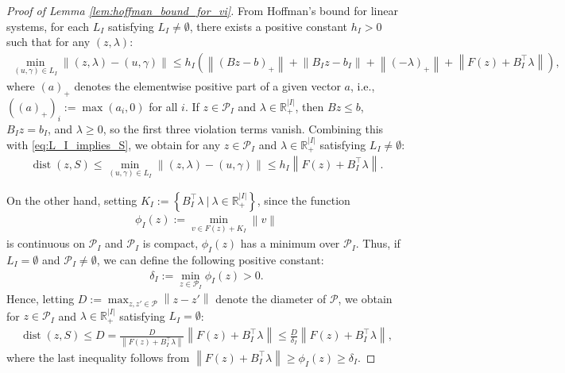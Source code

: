 \documentclass{article}
\DeclareMathOperator{\dist}{dist}
\newcommand{\R}{\mathbb{R}}
\theoremstyle{plain}
\begin{document}
\begin{proof}[Proof of Lemma \ref{lem:hoffman_bound_for_vi}]
    From Hoffman's bound \citep{hoffman1952approximate} for linear systems, for each $L_I$ satisfying $L_I \neq \emptyset$, there exists a positive constant $h_I > 0$ such that for any $(z, \lambda)$:
    \begin{align*}
        \min_{(u, \gamma)\in L_I}\left\|(z, \lambda) - (u, \gamma)\right\| \leq h_I \left(\left\|(Bz - b)_+\right\| + \left\|B_I z - b_I\right\| + \left\|(-\lambda)_+\right\| + \left\|F(z) + B_I^{\top}\lambda\right\|\right),
    \end{align*}
    where $(a)_+$ denotes the elementwise positive part of a given vector $a$, i.e., $((a)_+)_i := \max(a_i, 0)$ for all $i$.
    If $z\in \mathcal{P}_I$ and $\lambda\in \R^{|I|}_+$, then $Bz\leq b$, $B_I z = b_I$, and $\lambda\geq 0$, so the first three violation terms vanish.
    Combining this with \eqref{eq:L_I_implies_S}, we obtain for any $z\in \mathcal{P}_I$ and $\lambda\in \R^{|I|}_+$ satisfying $L_I \neq \emptyset$:
    \begin{align}
        \dist(z, S) \leq \min_{(u, \gamma)\in L_I}\left\|(z, \lambda) - (u, \gamma)\right\| \leq h_I \left\|F(z) + B_I^{\top}\lambda\right\|.
        \label{eq:active_set_estimate_for_non_empty_L}
    \end{align}

    On the other hand, setting $K_I := \left\{B_I^{\top}\lambda ~|~ \lambda\in \R^{|I|}_+\right\}$, since the function
    \begin{align*}
        \phi_I(z) := \min_{v\in F(z) + K_I}\left\|v\right\|
    \end{align*}
    is continuous on $\mathcal{P}_I$ and $\mathcal{P}_I$ is compact, $\phi_I(z)$ has a minimum over $\mathcal{P}_I$.
    Thus, if $L_I = \emptyset$ and $\mathcal{P}_I \neq \emptyset$, we can define the following positive constant:
    \begin{align*}
        \delta_I := \min_{z\in \mathcal{P}_I}\phi_I(z) > 0.
    \end{align*}
    Hence, letting $D := \max_{z, z'\in \mathcal{P}}\left\|z - z'\right\|$ denote the diameter of $\mathcal{P}$, we obtain for $z\in \mathcal{P}_I$ and $\lambda\in \R^{|I|}_+$ satisfying $L_I = \emptyset$:
    \begin{align}
        \dist(z, S) \leq D = \frac{D}{\left\|F(z) + B_I^{\top}\lambda\right\|}\left\|F(z) + B_I^{\top}\lambda\right\| \leq \frac{D}{\delta_I}\left\|F(z) + B_I^{\top}\lambda\right\|,
        \label{eq:active_set_estimate_for_empty_L}
    \end{align}
    where the last inequality follows from $\left\|F(z) + B_I^{\top}\lambda\right\| \geq \phi_I(z) \geq \delta_I$.


\end{proof}
\end{document}
